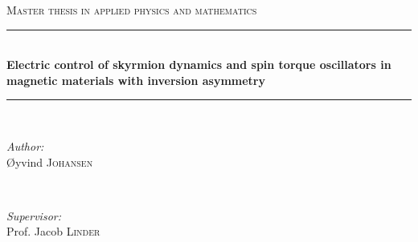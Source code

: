 \documentclass[12pt, a4paper, twoside, openright]{report}
\numberwithin{equation}{chapter}
\numberwithin{figure}{chapter}
\numberwithin{table}{chapter}
\begin{document}
\begin{titlepage}

\newcommand{\HRule}{\rule{\linewidth}{0.5mm}} %

\center %
 

\textsc{\Large Master thesis in applied physics and mathematics}\\[0.5cm] %


\HRule \\[0.4cm]
{ \huge \bfseries Electric control of skyrmion dynamics and spin torque oscillators in magnetic materials with inversion asymmetry}\\[0.4cm]
\HRule \\[1.5cm]
 

\begin{minipage}{0.4\textwidth}
\begin{flushleft} \large
\emph{Author:}\\
\O yvind \textsc{Johansen} %
\end{flushleft}
\end{minipage}
~
\begin{minipage}{0.4\textwidth}
\begin{flushright} \large
\emph{Supervisor:} \\
Prof. Jacob \textsc{Linder} %
\end{flushright}
\end{minipage}\\[4cm]


\end{titlepage}
\end{document}
